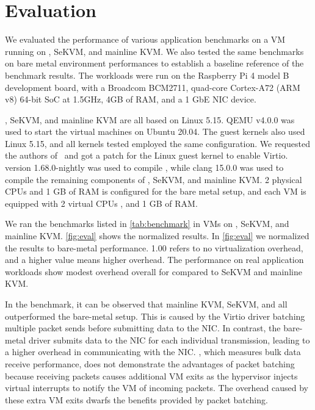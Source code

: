 \chapter{Evaluation}
\label{sec:eval}

We evaluated the performance of various application benchmarks
on a VM running on \rustsec{}, SeKVM, and mainline KVM.
We also tested the same
benchmarks on bare metal environment performances to establish a baseline
reference of the benchmark results. The workloads were run on the Raspberry
Pi 4 model B development board, with a Broadcom BCM2711, quad-core
Cortex-A72 (ARM v8) 64-bit SoC at 1.5GHz, 4GB of RAM, and a 1 GbE NIC device.

\rustsec{}, SeKVM, and mainline KVM are all based on Linux 5.15.
QEMU v4.0.0 was used to start the virtual machines on Ubuntu 20.04. The guest
kernels also used Linux 5.15, and all kernels tested employed the same 
configuration. We requested the authors of~\cite{hypsec} and got a patch for
the Linux guest kernel to enable Virtio.
 version 1.68.0-nightly was used to compile \rustcore{},
while clang 15.0.0 was used to compile the remaining components of
\rustsec{}, SeKVM, and mainline KVM.
2 physical CPUs and 1 GB of RAM is configured for the bare
metal setup, and each VM is equipped with 2 virtual CPUs , and 1 GB of RAM.

We ran the benchmarks listed in \autoref{tab:benchmark} in VMs on
\rustsec{}, SeKVM, and mainline KVM. \autoref{fig:eval} shows the normalized
results. In \autoref{fig:eval} we normalized the results to bare-metal
performance. 1.00 refers to no virtualization overhead, and
a higher value means higher overhead. The performance on real application
workloads show modest overhead overall for \rustsec{} compared to SeKVM and
mainline KVM.

In the  benchmark, it can be observed that mainline KVM,
SeKVM, and \rustsec{} all outperformed the bare-metal setup. This is caused by
the Virtio driver batching multiple packet sends before submitting data to the
NIC. In contrast, the bare-metal driver submits data to the NIC for each
individual transmission, leading to a higher overhead in communicating with
the NIC.
, which measures bulk data receive performance, does not
demonstrate the advantages of packet batching because receiving packets causes
additional VM exits as the hypervisor injects virtual interrupts to notify the
VM of incoming packets. The overhead caused by these extra VM exits dwarfs the
benefits provided by packet batching.

